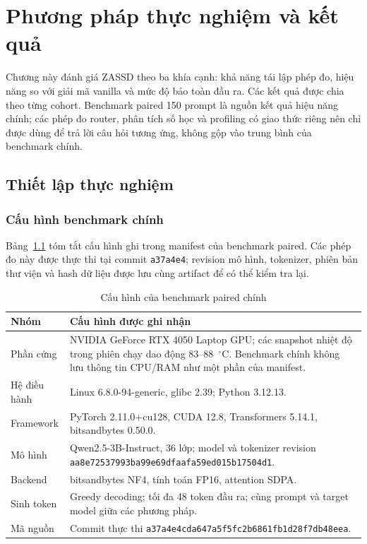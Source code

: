 \chapter{Phương pháp thực nghiệm và kết quả}

Chương này đánh giá ZASSD theo ba khía cạnh: khả năng tái lập phép đo, hiệu năng so với giải mã vanilla và mức độ bảo toàn đầu ra. Các kết quả được chia theo từng cohort. Benchmark paired 150 prompt là nguồn kết quả hiệu năng chính; các phép đo router, phân tích số học và profiling có giao thức riêng nên chỉ được dùng để trả lời câu hỏi tương ứng, không gộp vào trung bình của benchmark chính.

\section{Thiết lập thực nghiệm}

\subsection{Cấu hình benchmark chính}
Bảng~\ref{tab:ch5-main-config} tóm tắt cấu hình ghi trong manifest của benchmark paired. Các phép đo này được thực thi tại commit \texttt{a37a4e4}; revision mô hình, tokenizer, phiên bản thư viện và hash dữ liệu được lưu cùng artifact để có thể kiểm tra lại.

\begin{table}[htbp]
\centering
\small
\caption{Cấu hình của benchmark paired chính}
\label{tab:ch5-main-config}
\begin{tabularx}{\textwidth}{@{}p{3.2cm}X@{}}
\toprule
\textbf{Nhóm} & \textbf{Cấu hình được ghi nhận} \\
\midrule
Phần cứng & NVIDIA GeForce RTX 4050 Laptop GPU; các snapshot nhiệt độ trong phiên chạy dao động 83--88~$^\circ$C. Benchmark chính không lưu thông tin CPU/RAM như một phần của manifest. \\
Hệ điều hành & Linux 6.8.0-94-generic, glibc 2.39; Python 3.12.13. \\
Framework & PyTorch 2.11.0+cu128, CUDA 12.8, Transformers 5.14.1, bitsandbytes 0.50.0. \\
Mô hình & Qwen2.5-3B-Instruct, 36 lớp; model và tokenizer revision \texttt{aa8e72537993ba99e69dfaafa59ed015b17504d1}. \\
Backend & bitsandbytes NF4, tính toán FP16, attention SDPA. \\
Sinh token & Greedy decoding; tối đa 48 token đầu ra; cùng prompt và target model giữa các phương pháp. \\
Mã nguồn & Commit thực thi \texttt{a37a4e4cda647a5f5fc2b6861fb1d28f7db48eea}. \\
\bottomrule
\end{tabularx}
\end{table}

